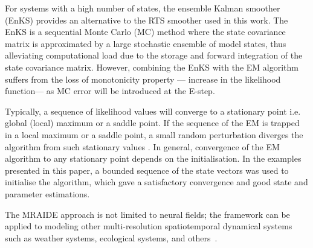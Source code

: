 \documentclass[review,authoryear,3p]{elsarticle}
\newcommand{\parham}[1]{\textcolor{blue}{#1}}
\begin{document}
For systems with a high number of states, the ensemble Kalman smoother (EnKS) \citep{Evensen2003,Evensen2009a,Evensen2009} provides an alternative to the RTS smoother used in this work. The EnKS is a sequential Monte Carlo (MC) method where the state covariance matrix is approximated by a large stochastic ensemble of model states, thus alleviating computational load due to the storage and forward integration of the state covariance matrix. However, combining the EnKS with the EM algorithm suffers from the loss of monotonicity property --- increase in the likelihood function--- as MC error will be introduced at the E-step.

Typically, a sequence of likelihood values will converge to a stationary point i.e. global (local) maximum or a saddle point. If the sequence of the EM is trapped in a local maximum or a saddle point, a small random perturbation diverges the algorithm from such stationary values \citep{McLachlan1997}. In general, convergence of the EM algorithm to any stationary point depends on the initialisation. In the examples presented in this paper, a bounded sequence of the state vectors was used to initialise the algorithm, which gave a satisfactory convergence and good state and parameter estimations.


The MRAIDE approach is not limited to neural fields; the framework can be applied to modeling other multi-resolution spatiotemporal dynamical systems such as weather systems, ecological systems, and others~\citep{Wikle2002,Xu2005}. 

\end{document}

